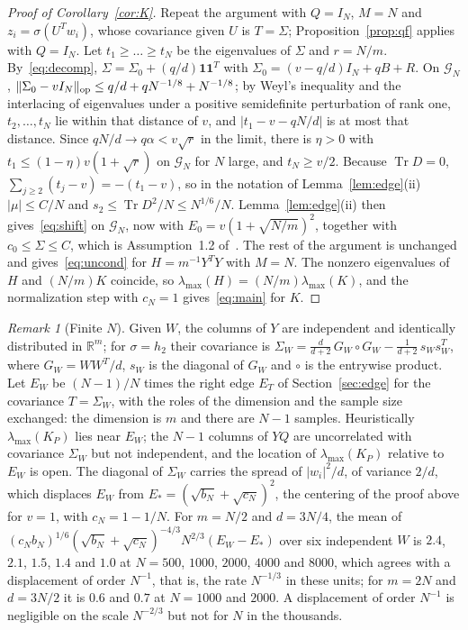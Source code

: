 \documentclass[11pt]{amsart}
\theoremstyle{remark}
\newtheorem{remark}[theorem]{Remark}
\numberwithin{equation}{section}
\newcommand{\RR}{\mathbb{R}}
\DeclareMathOperator{\Tr}{Tr}
\begin{document}
\begin{proof}[Proof of Corollary~\ref{cor:K}]
Repeat the argument with $Q=I_N$, $M=N$ and $z_i=\sigma(U^{T}w_i)$, whose covariance given $U$ is $T=\Sigma$; Proposition~\ref{prop:qf} applies with $Q=I_N$. Let $t_1\ge\dots\ge t_N$ be the eigenvalues of $\Sigma$ and $r=N/m$. By~\eqref{eq:decomp}, $\Sigma=\Sigma_0+(q/d)\mathbf 1\mathbf 1^{T}$ with $\Sigma_0=(v-q/d)I_N+qB+R$. On $\mathcal G_N$, $\|\Sigma_0-vI_N\|_{\rm op}\le q/d+qN^{-1/8}+N^{-1/8}$; by Weyl's inequality and the interlacing of eigenvalues under a positive semidefinite perturbation of rank one, $t_2,\dots,t_N$ lie within that distance of $v$, and $|t_1-v-qN/d|$ is at most that distance. Since $qN/d\to q\alpha<v\sqrt r$ in the limit, there is $\eta>0$ with $t_1\le(1-\eta)v(1+\sqrt r)$ on $\mathcal G_N$ for $N$ large, and $t_N\ge v/2$. Because $\Tr D=0$, $\sum_{j\ge2}(t_j-v)=-(t_1-v)$, so in the notation of Lemma~\ref{lem:edge}(ii) $|\mu|\le C/N$ and $s_2\le\Tr D^2/N\le N^{1/6}/N$. Lemma~\ref{lem:edge}(ii) then gives~\eqref{eq:shift} on $\mathcal G_N$, now with $E_0=v(1+\sqrt{N/m})^2$, together with $c_0\le\Sigma\le C$, which is Assumption~1.2 of~\cite{CL}. The rest of the argument is unchanged and gives~\eqref{eq:uncond} for $H=m^{-1}Y^{T}Y$ with $M=N$. The nonzero eigenvalues of $H$ and $(N/m)K$ coincide, so $\lambda_{\max}(H)=(N/m)\lambda_{\max}(K)$, and the normalization step with $c_N=1$ gives~\eqref{eq:main} for $K$.
\end{proof}

\begin{remark}[Finite $N$]\label{rem:finite}
Given $W$, the columns of $Y$ are independent and identically distributed in $\RR^{m}$; for $\sigma=h_2$ their covariance is $\Sigma_W=\frac{d}{d+2}\,G_W\circ G_W-\frac1{d+2}\,s_Ws_W^{T}$, where $G_W=WW^{T}/d$, $s_W$ is the diagonal of $G_W$ and $\circ$ is the entrywise product. Let $E_W$ be $(N-1)/N$ times the right edge $E_T$ of Section~\ref{sec:edge} for the covariance $T=\Sigma_W$, with the roles of the dimension and the sample size exchanged: the dimension is $m$ and there are $N-1$ samples. Heuristically $\lambda_{\max}(K_P)$ lies near $E_W$; the $N-1$ columns of $YQ$ are uncorrelated with covariance $\Sigma_W$ but not independent, and the location of $\lambda_{\max}(K_P)$ relative to $E_W$ is open. The diagonal of $\Sigma_W$ carries the spread of $|w_i|^2/d$, of variance $2/d$, which displaces $E_W$ from $E_*=(\sqrt{b_N}+\sqrt{c_N})^2$, the centering of the proof above for $v=1$, with $c_N=1-1/N$. For $m=N/2$ and $d=3N/4$, the mean of $(c_Nb_N)^{1/6}(\sqrt{b_N}+\sqrt{c_N})^{-4/3}N^{2/3}(E_W-E_*)$ over six independent $W$ is $2.4$, $2.1$, $1.5$, $1.4$ and $1.0$ at $N=500$, $1000$, $2000$, $4000$ and $8000$, which agrees with a displacement of order $N^{-1}$, that is, the rate $N^{-1/3}$ in these units; for $m=2N$ and $d=3N/2$ it is $0.6$ and $0.7$ at $N=1000$ and $2000$. A displacement of order $N^{-1}$ is negligible on the scale $N^{-2/3}$ but not for $N$ in the thousands.
\end{remark}
\end{document}
